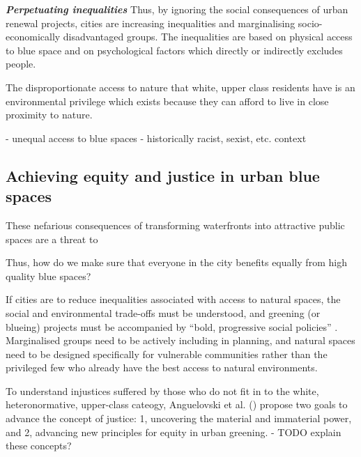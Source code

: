 \documentclass{article}
\newcommand{\bisection}[1]{\textbf{\textit{#1}}}
\begin{document}
\bisection{Perpetuating inequalities}
Thus, by ignoring the social consequences of urban renewal projects, cities are increasing inequalities and marginalising socio-economically disadvantaged groups. The inequalities are based on physical access to blue space and on psychological factors which directly or indirectly excludes people.

The disproportionate access to nature that white, upper class residents have is an environmental privilege which exists because they can afford to live in close proximity to nature.  

- unequal access to blue spaces
- historically racist, sexist, etc. context 




\subsection{Achieving equity and justice in urban blue spaces}

These nefarious consequences of transforming waterfronts into attractive public spaces are a threat to 

Thus, how do we make sure that everyone in the city benefits equally from high quality blue spaces? 

If cities are to reduce inequalities associated with access to natural spaces, the social and environmental trade-offs must be understood, and greening (or blueing) projects must be accompanied by ``bold, progressive social policies'' \parencite{anguelovski2021green}. Marginalised groups need to be actively including in planning, and natural spaces need to be designed specifically for vulnerable communities rather than the privileged few who already have the best access to natural environments.

To understand injustices suffered by those who do not fit in to the white, heteronormative, upper-class cateogy, Anguelovski et al. (\citeyear{anguelovski2020expanding}) propose two goals to advance the concept of justice: 1, uncovering the material and immaterial power, and 2, advancing new principles for equity in urban greening.
- TODO explain these concepts?
\end{document}
